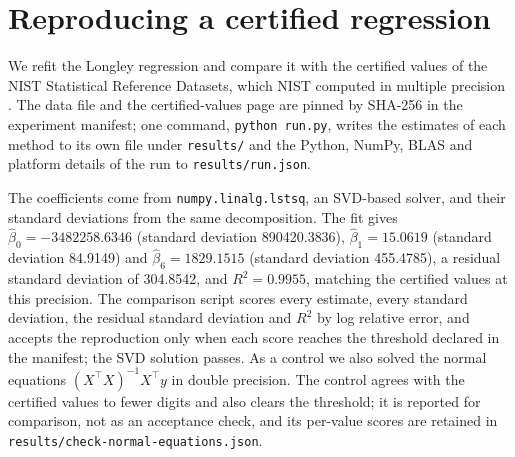 \section{Reproducing a certified regression}\label{sec:res_longley}

We refit the Longley regression \cite{longley1967} and compare it with the certified values of the NIST Statistical Reference Datasets, which NIST computed in multiple precision \cite{nist-strd-longley}. The data file and the certified-values page are pinned by SHA-256 in the experiment manifest; one command, \texttt{python run.py}, writes the estimates of each method to its own file under \texttt{results/} and the Python, NumPy, BLAS and platform details of the run to \texttt{results/run.json}.

The coefficients come from \texttt{numpy.linalg.lstsq}, an SVD-based solver, and their standard deviations from the same decomposition. The fit gives $\hat\beta_0 = -3482258.6346$ (standard deviation 890420.3836), $\hat\beta_1 = 15.0619$ (standard deviation 84.9149) and $\hat\beta_6 = 1829.1515$ (standard deviation 455.4785), a residual standard deviation of 304.8542, and $R^2 = 0.9955$, matching the certified values at this precision. The comparison script scores every estimate, every standard deviation, the residual standard deviation and $R^2$ by log relative error, and accepts the reproduction only when each score reaches the threshold declared in the manifest; the SVD solution passes. As a control we also solved the normal equations $(X^\top X)^{-1} X^\top y$ in double precision. The control agrees with the certified values to fewer digits and also clears the threshold; it is reported for comparison, not as an acceptance check, and its per-value scores are retained in \texttt{results/check-normal-equations.json}.
